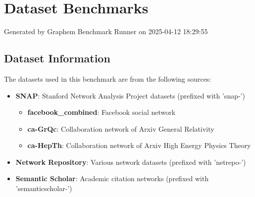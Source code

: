 \documentclass{article}
\begin{document}
\section*{Dataset Benchmarks}
Generated by Graphem Benchmark Runner on 2025-04-12 18:29:55
\subsection*{Dataset Information}
The datasets used in this benchmark are from the following sources:
\begin{itemize}
\item \textbf{SNAP}: Stanford Network Analysis Project datasets (prefixed with 'snap-')
  \begin{itemize}
  \item \textbf{facebook\_combined}: Facebook social network
  \item \textbf{ca-GrQc}: Collaboration network of Arxiv General Relativity
  \item \textbf{ca-HepTh}: Collaboration network of Arxiv High Energy Physics Theory
  \end{itemize}
\item \textbf{Network Repository}: Various network datasets (prefixed with 'netrepo-')
\item \textbf{Semantic Scholar}: Academic citation networks (prefixed with 'semanticscholar-')
\end{itemize}
\end{document}
